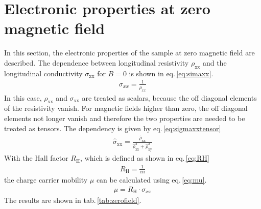 \section{Electronic properties at zero magnetic field}
In this section, the electronic properties of the sample at zero magnetic field are described.
The dependence between longitudinal resistivity $\rho_\text{xx}$ and the longitudinal conductivity $\sigma_\text{xx}$
for $B=0$ is shown in eq.\,\ref{eq:simaxx}.
\begin{align}
    \sigma_{xx} = \frac{1}{\rho_{xx}}
    \label{eq:simaxx}
\end{align}
In this case, $\rho_\text{xx}$ and $\sigma_\text{xx}$ are treated as scalars, because the off diagonal elements of the resistivity vanish.
For magnetic fields higher than zero, the off diagonal elements not longer vanish and therefore the two properties are needed to be treated as
tensors. The dependency is given by eq.\,\ref{eq:sigmaxxtensor}
\begin{align}
    \hat{\sigma}_\text{xx} = \frac{\hat{\rho}_\text{xx}}{\hat{\rho}_\text{xx}^2 + \hat{\rho}_\text{xy}^2}
    \label{eq:sigmaxxtensor}
\end{align}
With the Hall factor $R_\text{H}$, which is defined as shown in eq.\,\ref{eq:RH}
\begin{align}
    R_\text{H}=\frac{1}{en}
\end{align}
the charge carrier mobility $\mu$ can be calculated using eq.\,\ref{eq:mu}.
\begin{align}
    \mu = R_\text{H} \cdot \sigma_{xx}
    \label{eq:mu}
\end{align}
The results are shown in tab.\,\ref{tab:zerofield}.

